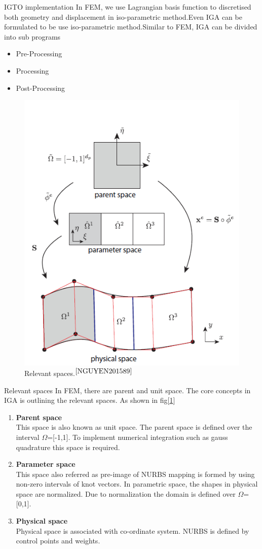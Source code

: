 \documentclass[a4paper,12pt,times]{article}
\begin{document}
\begin{section}{IGTO implementation}
In FEM, we use Lagrangian basis function to discretised both geometry and displacement in iso-parametric method.Even IGA can be formulated to be use iso-parametric method.Similar to FEM, IGA can be divided into sub programs

\begin{itemize}
\item Pre-Processing

\item Processing

\item Post-Processing

\end{itemize}
\begin{figure}[h!]
\centering
\includegraphics[width=0.45\linewidth]{relevant_spaces.png}
\caption{ Relevant spaces.$^{\cite{NGUYEN201589}}$}
\label{fig:Relevant spaces}
\end{figure}

\begin{subsection}{Relevant spaces}
In FEM, there are parent and unit space. The core concepts in IGA is outlining the relevant spaces. As shown in fig[\ref{fig:Relevant spaces}]

\begin{enumerate}
\item \textbf{Parent space} 
\\ This space is also known as unit space. The parent space is defined over the interval $\Omega$=[-1,1]. To implement numerical integration such as gauss quadrature this space is required.

\item \textbf{Parameter space}
\\ This space also referred as pre-image of NURBS mapping is formed by using non-zero intervals of knot vectors. In parametric space, the shapes in physical space are normalized. Due to normalization the domain is defined over   $\Omega$=[0,1].
\item \textbf{Physical space}
\\ Physical space is associated with co-ordinate system. NURBS is defined by control points and weights.


\end{enumerate}
\end{subsection}
\end{section}
\end{document}

